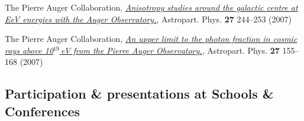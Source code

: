 \documentclass[11pt, a4paper]{article}
\newcommand{\years}[1]{\marginnote{\scriptsize #1}}
\begin{document}
\begin{etaremune}
\item \years{2007}The Pierre Auger Collaboration,
\href{http://dx.doi.org/10.1016/j.astropartphys.2006.11.002}{\emph{Anisotropy
studies around the galactic centre at EeV energies with the Auger
Observatory.}},  Astropart. Phys. {\bf 27} 244--253 (2007)

\item \years{2007}The Pierre Auger Collaboration,
\href{http://dx.doi.org/10.1016/j.astropartphys.2006.10.004}{\emph{An upper
limit to the photon fraction in cosmic rays above 10$^{19}$\,eV from the Pierre
Auger Observatory.}}, Astropart. Phys. {\bf 27} 155--168 (2007)
\end{etaremune}

\subsection*{Participation \& presentations at Schools \& Conferences}
\noindent
\end{document}
